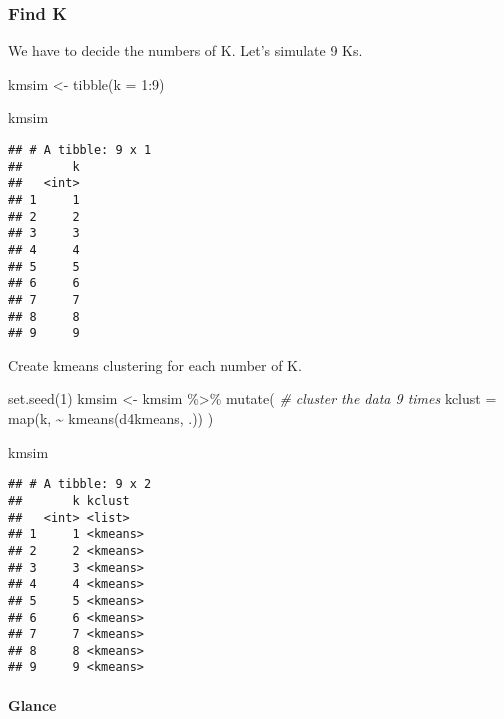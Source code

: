\documentclass[
]{article}
\newenvironment{Shaded}{\begin{snugshade}}{\end{snugshade}}
\newcommand{\AttributeTok}[1]{\textcolor[rgb]{0.77,0.63,0.00}{#1}}
\newcommand{\CommentTok}[1]{\textcolor[rgb]{0.56,0.35,0.01}{\textit{#1}}}
\newcommand{\DecValTok}[1]{\textcolor[rgb]{0.00,0.00,0.81}{#1}}
\newcommand{\FunctionTok}[1]{\textcolor[rgb]{0.00,0.00,0.00}{#1}}
\newcommand{\NormalTok}[1]{#1}
\newcommand{\OtherTok}[1]{\textcolor[rgb]{0.56,0.35,0.01}{#1}}
\newcommand{\SpecialCharTok}[1]{\textcolor[rgb]{0.00,0.00,0.00}{#1}}
\begin{document}
\hypertarget{find-k}{%
\subsubsection{Find K}\label{find-k}}

We have to decide the numbers of K. Let's simulate 9 Ks.

\begin{Shaded}
\begin{Highlighting}[]
\NormalTok{kmsim }\OtherTok{\textless{}{-}} 
\FunctionTok{tibble}\NormalTok{(}\AttributeTok{k =} \DecValTok{1}\SpecialCharTok{:}\DecValTok{9}\NormalTok{)}

\NormalTok{kmsim}
\end{Highlighting}
\end{Shaded}

\begin{verbatim}
## # A tibble: 9 x 1
##       k
##   <int>
## 1     1
## 2     2
## 3     3
## 4     4
## 5     5
## 6     6
## 7     7
## 8     8
## 9     9
\end{verbatim}

Create kmeans clustering for each number of K.

\begin{Shaded}
\begin{Highlighting}[]
\FunctionTok{set.seed}\NormalTok{(}\DecValTok{1}\NormalTok{)}
\NormalTok{kmsim }\OtherTok{\textless{}{-}}\NormalTok{ kmsim }\SpecialCharTok{\%\textgreater{}\%} 
\FunctionTok{mutate}\NormalTok{(}
    \CommentTok{\# cluster the data 9 times}
    \AttributeTok{kclust =} \FunctionTok{map}\NormalTok{(k, }\SpecialCharTok{\textasciitilde{}} \FunctionTok{kmeans}\NormalTok{(d4kmeans, .))}
\NormalTok{  )}

\NormalTok{kmsim }
\end{Highlighting}
\end{Shaded}

\begin{verbatim}
## # A tibble: 9 x 2
##       k kclust  
##   <int> <list>  
## 1     1 <kmeans>
## 2     2 <kmeans>
## 3     3 <kmeans>
## 4     4 <kmeans>
## 5     5 <kmeans>
## 6     6 <kmeans>
## 7     7 <kmeans>
## 8     8 <kmeans>
## 9     9 <kmeans>
\end{verbatim}

\hypertarget{glance}{%
\paragraph{Glance}\label{glance}}
\end{document}
